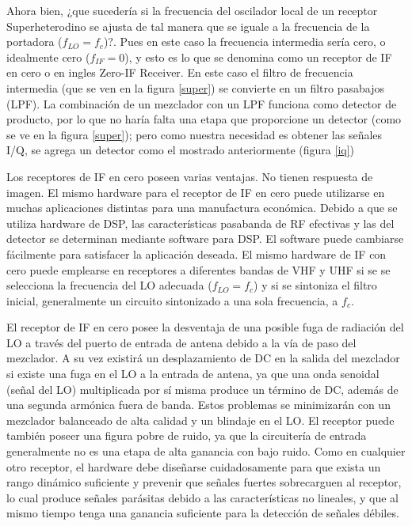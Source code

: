 \documentclass[a4paper,12pt]{report} %
\begin{document}
Ahora bien, ¿que sucedería si la frecuencia del oscilador local de un receptor Superheterodino se ajusta de tal manera que se iguale a la frecuencia de la portadora ($f_{LO} = f_c$)?. Pues en este caso la frecuencia intermedia sería cero, o idealmente cero ($f_{IF} = 0$), y esto es lo que se denomina como un receptor de IF en cero o en ingles Zero-IF Receiver. En este caso el filtro de frecuencia intermedia (que se ven en la figura \ref{super}) se convierte en un filtro pasabajos (LPF). La combinación de un mezclador con un LPF funciona como detector de producto, por lo que no haría falta una etapa que proporcione un detector (como se ve en la figura \ref{super}); pero como nuestra necesidad es obtener las señales I/Q, se agrega un detector como el mostrado anteriormente (figura \ref{iq})

Los receptores de IF en cero poseen varias ventajas. No tienen respuesta de imagen. El mismo hardware para el receptor de IF en cero puede utilizarse en muchas aplicaciones distintas para una manufactura económica. Debido a que se utiliza hardware de DSP, las características pasabanda de RF efectivas y las del detector se determinan mediante software para DSP. El software puede cambiarse fácilmente para satisfacer la aplicación deseada. El mismo hardware de IF con cero puede emplearse en receptores a diferentes bandas de VHF y UHF si se se selecciona la frecuencia del LO adecuada ($f_{LO} = f_c$) y si se sintoniza el filtro inicial, generalmente un circuito sintonizado a una sola frecuencia, a $f_c$.

El receptor de IF en cero posee la desventaja de una posible fuga de radiación del LO a través del puerto de entrada de antena debido a la vía de paso del mezclador. A su vez existirá un desplazamiento de DC en la salida del mezclador si existe una fuga en el LO a la entrada de antena, ya que una onda senoidal (señal del LO) multiplicada por sí misma produce un término de DC, además de una segunda armónica fuera de banda. Estos problemas se minimizarán con un mezclador balanceado de alta calidad y un blindaje en el LO. El receptor puede también poseer una figura pobre de ruido, ya que la circuitería de entrada generalmente no es una etapa de alta ganancia con bajo ruido. Como en cualquier otro receptor, el hardware debe diseñarse cuidadosamente para que exista un rango dinámico suficiente y prevenir que señales fuertes sobrecarguen al receptor, lo cual produce señales parásitas debido a las características no lineales, y que al mismo tiempo tenga una ganancia suficiente para la detección de señales débiles.
\end{document}
